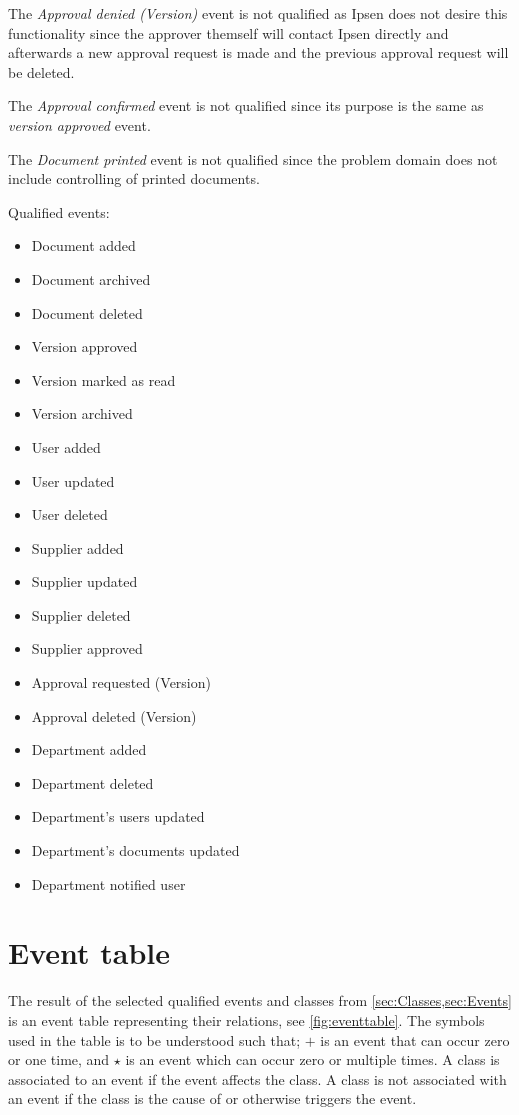 The \textit{Approval denied (Version)} event is not qualified as Ipsen does not desire this functionality since the approver themself will contact Ipsen directly and afterwards a new approval request is made and the previous approval request will be deleted.

The \textit{Approval confirmed} event is not qualified since its purpose is the same as \textit{version approved} event.

The \textit{Document printed} event is not qualified since the problem domain does not include controlling of printed documents.

Qualified events:
\begin{multicols}{2}
	\begin{itemize}
	\item Document added
	\item Document archived
	\item Document deleted
	\item Version approved
	\item Version marked as read
	\item Version archived
	\item User added
	\item User updated
	\item User deleted
	\item Supplier added
	\item Supplier updated
	\item Supplier deleted
	\item Supplier approved
	\item Approval requested (Version)
	\item Approval deleted (Version)
	\item Department added
	\item Department deleted
	\item Department's users updated
	\item Department's documents updated
	\item Department notified user
	\end{itemize}
\end{multicols}

\section{Event table}\label{sec:EventTable}
The result of the selected qualified events and classes from \cref{sec:Classes,sec:Events} is an event table representing their relations, see \cref{fig:eventtable}.
The symbols used in the table is to be understood such that; $+$ is an event that can occur zero or one time, and $\star$ is an event which can occur zero or multiple times.
A class is associated to an event if the event affects the class.
A class is not associated with an event if the class is the cause of or otherwise triggers the event.

